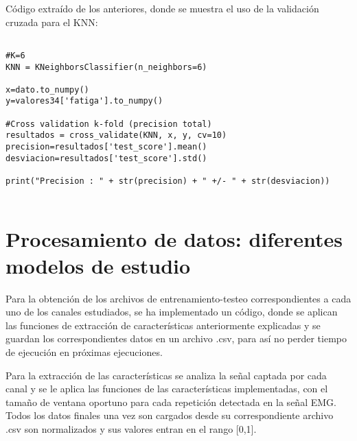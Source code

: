 Código extraído de los anteriores, donde se muestra el uso de la validación cruzada para el KNN:
\begin{lstlisting}

#K=6
KNN = KNeighborsClassifier(n_neighbors=6)

x=dato.to_numpy()
y=valores34['fatiga'].to_numpy()

#Cross validation k-fold (precision total)
resultados = cross_validate(KNN, x, y, cv=10)
precision=resultados['test_score'].mean()
desviacion=resultados['test_score'].std()
    
print("Precision : " + str(precision) + " +/- " + str(desviacion))


\end{lstlisting}
 
 
 
\section{Procesamiento de datos: diferentes modelos de estudio}
Para la obtención de los archivos de entrenamiento-testeo correspondientes a cada uno de los canales estudiados, se ha implementado un código, donde se aplican las funciones de extracción de características anteriormente explicadas y se guardan los correspondientes datos en un archivo .csv, para así no perder tiempo de ejecución en próximas ejecuciones. 

Para la extracción de las características se analiza la señal captada por cada canal y se le aplica las funciones de las características implementadas, con el tamaño de ventana oportuno para cada repetición detectada en la señal EMG. Todos los datos finales una vez son cargados desde su correspondiente archivo .csv son normalizados y sus valores entran en el rango [0,1].

